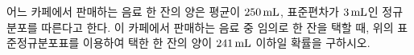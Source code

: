 \noindent\begin{minipage}[t]{0.58\linewidth}\vspace{0pt}\raggedright 어느 카페에서 판매하는 음료 한 잔의 양은 평균이 $250\mkern3mu \mathrm{mL}$, 표준편차가 $3\mkern3mu \mathrm{mL}$인 정규분포를 따른다고 한다. 이 카페에서 판매하는 음료 중 임의로 한 잔을 택할 때, 위의 표준정규분포표를 이용하여 택한 한 잔의 양이 $241\mkern3mu \mathrm{mL}$ 이하일 확률을 구하시오.\end{minipage}\hfill\begin{minipage}[t]{0.4\linewidth}\vspace{0pt}\centering \resizebox{\ifdim\width>\linewidth\linewidth\else\width\fi}{!}{}\end{minipage}\par
